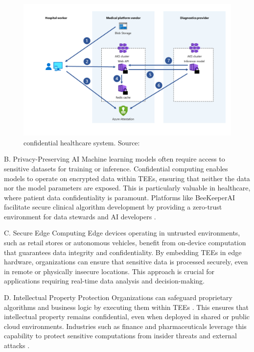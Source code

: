 \documentclass[conference]{IEEEtran}
\begin{document}
\begin{figure}[H]
\centerline{\includegraphics[width=\linewidth]{figures/confidential_healthcare.png}}
\caption{confidential healthcare system. Source: \cite{azure_mpc}}
\label{fig:mpc_banking}
\end{figure}

B. Privacy-Preserving AI
Machine learning models often require access to sensitive datasets for training or inference. 
Confidential computing enables models to operate on encrypted data within TEEs, ensuring that 
neither the data nor the model parameters are exposed. This is particularly valuable in healthcare, 
where patient data confidentiality is paramount. Platforms like BeeKeeperAI facilitate secure 
clinical algorithm development by providing a zero-trust environment for data stewards and AI 
developers \cite{beekeeper_ai}.

C. Secure Edge Computing
Edge devices operating in untrusted environments, such as retail stores or autonomous vehicles, 
benefit from on-device computation that guarantees data integrity and confidentiality. By 
embedding TEEs in edge hardware, organizations can ensure that sensitive data is processed 
securely, even in remote or physically insecure locations. This approach is crucial for 
applications requiring real-time data analysis and decision-making.

D. Intellectual Property Protection
Organizations can safeguard proprietary algorithms and business logic by executing them within 
TEEs \cite{ibm}. This ensures that intellectual property remains confidential, even when deployed in shared 
or public cloud environments. Industries such as finance and pharmaceuticals leverage this 
capability to protect sensitive computations from insider threats and external attacks \cite{anjuna_ip}.
\end{document}
